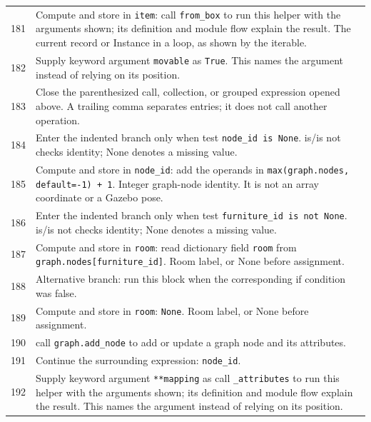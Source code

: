 \documentclass[11pt,a4paper]{book}
\begin{document}
\begin{longtable}{r p{}}
181 & Compute and store in \texttt{item}: call \texttt{from\_box} to run this helper with the arguments shown; its definition and module flow explain the result. The current record or Instance in a loop, as shown by the iterable. \\

182 & Supply keyword argument \texttt{movable} as \texttt{True}. This names the argument instead of relying on its position. \\

183 & Close the parenthesized call, collection, or grouped expression opened above. A trailing comma separates entries; it does not call another operation. \\

184 & Enter the indented branch only when test \texttt{node\_id is None}. is/is not checks identity; None denotes a missing value. \\

185 & Compute and store in \texttt{node\_id}: add the operands in \texttt{max(graph.nodes, default=-1) + 1}. Integer graph-node identity. It is not an array coordinate or a Gazebo pose. \\

186 & Enter the indented branch only when test \texttt{furniture\_id is not None}. is/is not checks identity; None denotes a missing value. \\

187 & Compute and store in \texttt{room}: read dictionary field \texttt{room} from \texttt{graph.nodes[furniture\_id]}. Room label, or None before assignment. \\

188 & Alternative branch: run this block when the corresponding if condition was false. \\

189 & Compute and store in \texttt{room}: \texttt{None}. Room label, or None before assignment. \\

190 & call \texttt{graph.add\_node} to add or update a graph node and its attributes. \\

191 & Continue the surrounding expression: \texttt{node\_id}. \\

192 & Supply keyword argument \texttt{**mapping} as call \texttt{\_attributes} to run this helper with the arguments shown; its definition and module flow explain the result. This names the argument instead of relying on its position. \\


\end{longtable}
\end{document}
